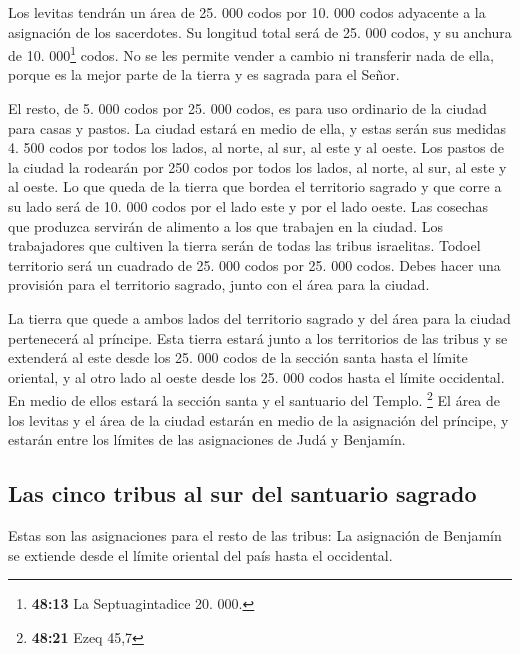  Los levitas tendrán un área de 25. 000 codos por 10. 000
codos adyacente a la asignación de los sacerdotes. Su longitud total
será de 25. 000 codos, y su anchura de 10. 000\footnote{\textbf{48:13}
  La Septuagintadice 20. 000.} codos.  No se les permite
vender a cambio ni transferir nada de ella, porque es la mejor parte de
la tierra y es sagrada para el Señor.

 El resto, de 5. 000 codos por 25. 000 codos, es para uso
ordinario de la ciudad para casas y pastos. La ciudad estará en medio de
ella,  y estas serán sus medidas 4. 500 codos por todos
los lados, al norte, al sur, al este y al oeste.  Los
pastos de la ciudad la rodearán por 250 codos por todos los lados, al
norte, al sur, al este y al oeste.  Lo que queda de la
tierra que bordea el territorio sagrado y que corre a su lado será de
10. 000 codos por el lado este y por el lado oeste. Las cosechas que
produzca servirán de alimento a los que trabajen en la ciudad.
 Los trabajadores que cultiven la tierra serán de todas
las tribus israelitas.  Todoel territorio será un
cuadrado de 25. 000 codos por 25. 000 codos. Debes hacer una provisión
para el territorio sagrado, junto con el área para la ciudad.

 La tierra que quede a ambos lados del territorio sagrado
y del área para la ciudad pertenecerá al príncipe. Esta tierra estará
junto a los territorios de las tribus y se extenderá al este desde los
25. 000 codos de la sección santa hasta el límite oriental, y al otro
lado al oeste desde los 25. 000 codos hasta el límite occidental. En
medio de ellos estará la sección santa y el santuario del Templo.
\footnote{\textbf{48:21} Ezeq 45,7}  El área de los
levitas y el área de la ciudad estarán en medio de la asignación del
príncipe, y estarán entre los límites de las asignaciones de Judá y
Benjamín.

\hypertarget{las-cinco-tribus-al-sur-del-santuario-sagrado}{%
\subsection{Las cinco tribus al sur del santuario
sagrado}\label{las-cinco-tribus-al-sur-del-santuario-sagrado}}

 Estas son las asignaciones para el resto de las tribus:
La asignación de Benjamín se extiende desde el límite oriental del país
hasta el occidental.


